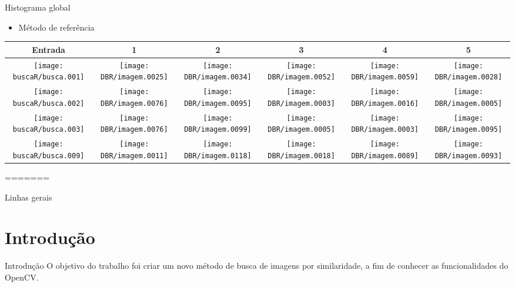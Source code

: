 \documentclass[
    style=paintings,
    paper=screen,
    blackslide,
    nopagebreaks,
    fleqn
]{powerdot}
\begin{document}
\begin{slide}{Histograma global}
\begin{itemize}[type=1]
\item <1-> Método de referência
\end{itemize}
\vspace{-0.8cm}
\begin{table}[H]
\begin{center}
\begin{tabular}{c|ccccc}
\hline 
Entrada & 1 & 2 & 3 & 4 & 5\tabularnewline
\hline
\texttt{[image: buscaR/busca.001]} & 
\texttt{[image: DBR/imagem.0025]} & 
\texttt{[image: DBR/imagem.0034]} & 
\texttt{[image: DBR/imagem.0052]} & 
\texttt{[image: DBR/imagem.0059]} &
\texttt{[image: DBR/imagem.0028]} 
\tabularnewline
\hline 
\texttt{[image: buscaR/busca.002]} & 
\texttt{[image: DBR/imagem.0076]} & 
\texttt{[image: DBR/imagem.0095]} & 
\texttt{[image: DBR/imagem.0003]} & 
\texttt{[image: DBR/imagem.0016]} &
\texttt{[image: DBR/imagem.0005]} 
\tabularnewline
\hline 
\texttt{[image: buscaR/busca.003]} & 
\texttt{[image: DBR/imagem.0076]} & 
\texttt{[image: DBR/imagem.0099]} & 
\texttt{[image: DBR/imagem.0005]} & 
\texttt{[image: DBR/imagem.0003]} &
\texttt{[image: DBR/imagem.0095]} 
\tabularnewline
\hline 
\texttt{[image: buscaR/busca.009]} & 
\texttt{[image: DBR/imagem.0011]} & 
\texttt{[image: DBR/imagem.0118]} & 
\texttt{[image: DBR/imagem.0018]} & 
\texttt{[image: DBR/imagem.0089]} &
\texttt{[image: DBR/imagem.0093]} 
\tabularnewline
\hline 
\end{tabular}
\end{center}
\end{table}
\end{slide}


=======
\begin{slide}{Linhas gerais}
\tableofcontents{}
\setcounter{secnumdepth}{-1}
\end{slide}

\section[slide=false]{Introdução}
\begin{slide}{Introdução}
O objetivo do trabalho foi criar um novo método de busca de imagens por similaridade, 
a fim de conhecer as funcionalidades do OpenCV.
\end{slide}
\end{document}
